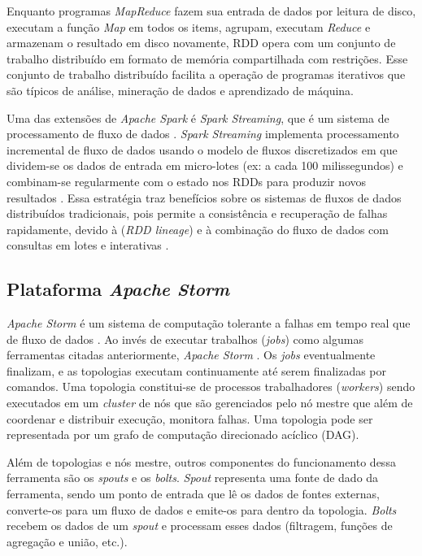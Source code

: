 Enquanto programas \emph{MapReduce} fazem sua entrada de dados por leitura de
disco, executam a função \emph{Map} em todos os items, agrupam, executam
\emph{Reduce} e armazenam o resultado em disco novamente, RDD opera com um
conjunto de trabalho distribuído em formato de memória compartilhada com
restrições. Esse conjunto de trabalho distribuído facilita a operação de programas iterativos
que são típicos de análise, mineração de dados e aprendizado de máquina.

Uma das extensões de \emph{Apache Spark} é \emph{Spark Streaming}, que é um
sistema de processamento de fluxo de dados 
\cite{zaharia2016,sparkStreaming2016}.
\emph{Spark Streaming} implementa processamento incremental de fluxo de
dados usando o modelo de fluxos discretizados em que dividem-se os dados de entrada
em micro-lotes (ex: a cada 100 milissegundos) e combinam-se regularmente com o
estado nos RDDs para produzir novos resultados \cite{zaharia2016}.
Essa estratégia traz benefícios sobre os sistemas de fluxos de dados distribuídos
tradicionais, pois permite a consistência e recuperação de falhas rapidamente,
devido à  (\emph{RDD lineage})
e à combinação do fluxo de dados com
consultas em lotes e interativas \cite{sparkStreaming2016,Lopez2018}.

\subsection{Plataforma \emph{Apache Storm}}

\emph{Apache Storm} é um sistema de computação tolerante a falhas em tempo
real que  de fluxo de dados
\cite{ApacheStorm2020,Lopez2018}.
Ao invés de executar trabalhos (\emph{jobs}) como algumas ferramentas citadas
anteriormente, \emph{Apache Storm} .
Os \emph{jobs} eventualmente finalizam, e as topologias executam continuamente até
serem finalizadas por comandos.
Uma topologia constitui-se de processos trabalhadores (\emph{workers}) sendo executados
em um \emph{cluster} de nós que são gerenciados pelo nó mestre que além de
coordenar e distribuir execução, monitora falhas.
Uma topologia pode ser representada por um grafo de computação direcionado
acíclico (DAG).

Além de topologias e nós mestre, outros componentes do funcionamento dessa
ferramenta são os \emph{spouts} e os \emph{bolts}.
\emph{Spout} representa uma fonte de dado da ferramenta, sendo um ponto de
entrada que lê os dados de fontes externas, converte-os para um fluxo de dados e
emite-os para dentro da topologia.
\emph{Bolts} recebem os dados de um \emph{spout} e processam esses dados
(filtragem, funções de agregação e união, etc.).

